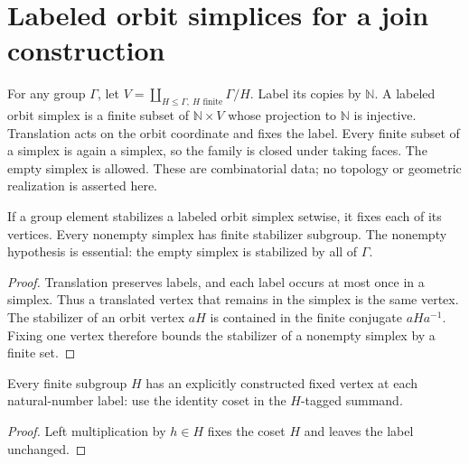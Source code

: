 \section{Labeled orbit simplices for a join construction}

\begin{definition}\label{def:labeled-orbit-simplex}
\leanok
For any group $\Gamma$, let $V=\coprod_{H\leq\Gamma,\ H\text{ finite}}\Gamma/H$.
Label its copies by $\mathbb N$. A labeled orbit simplex is a finite subset of
$\mathbb N\times V$ whose projection to $\mathbb N$ is injective. Translation
acts on the orbit coordinate and fixes the label. Every finite subset of a
simplex is again a simplex, so the family is closed under taking faces.
The empty simplex is allowed. These are combinatorial data; no topology or
geometric realization is asserted here.
\end{definition}

\begin{proposition}\label{prop:labeled-orbit-simplex-isotropy}
If a group element stabilizes a labeled orbit simplex setwise, it fixes each
of its vertices. Every nonempty simplex has finite stabilizer subgroup.
The nonempty hypothesis is essential: the empty simplex is stabilized by all
of $\Gamma$.
\end{proposition}
\begin{proof}
\leanok
Translation preserves labels, and each label occurs at most once in a
simplex. Thus a translated vertex that remains in the simplex is the same
vertex. The stabilizer of an orbit vertex $aH$ is contained in the finite
conjugate $aHa^{-1}$. Fixing one vertex therefore bounds the stabilizer of a
nonempty simplex by a finite set.
\end{proof}

\begin{proposition}\label{prop:labeled-orbit-fixed-vertices}
Every finite subgroup $H$ has an explicitly constructed fixed vertex at each
natural-number label: use the identity coset in the $H$-tagged summand.
\end{proposition}
\begin{proof}
\leanok
Left multiplication by $h\in H$ fixes the coset $H$ and leaves the label
unchanged.
\end{proof}

